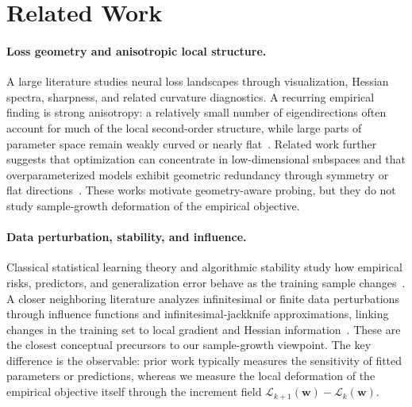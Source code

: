 \documentclass{article}
\begin{document}
\section{Related Work}\label{sec:related}

\paragraph{Loss geometry and anisotropic local structure.}
A large literature studies neural loss landscapes through visualization, Hessian spectra, sharpness, and related curvature diagnostics. A recurring empirical finding is strong anisotropy: a relatively small number of eigendirections often account for much of the local second-order structure, while large parts of parameter space remain weakly curved or nearly flat~\citep{li2018visualizing,sagun2017hessian,ghorbani2019investigation,papyan2019fullspectrum,xu2024mining}. Related work further suggests that optimization can concentrate in low-dimensional subspaces and that overparameterized models exhibit geometric redundancy through symmetry or flat directions~\citep{gurari2018tiny,li2018intrinsic,simsek2021geometry,draxler2018essentially,garipov2018mode}. These works motivate geometry-aware probing, but they do not study sample-growth deformation of the empirical objective.

\paragraph{Data perturbation, stability, and influence.}
Classical statistical learning theory and algorithmic stability study how empirical risks, predictors, and generalization error behave as the training sample changes~\citep{vapnik1998statistical,shalev2014understanding,bousquet2002stability,hardt2016train,feldman2019high,bousquet2020sharper}. A closer neighboring literature analyzes infinitesimal or finite data perturbations through influence functions and infinitesimal-jackknife approximations, linking changes in the training set to local gradient and Hessian information~\citep{koh2017influence,giordano2019swiss,koh2019group,basu2020secondorder}. These are the closest conceptual precursors to our sample-growth viewpoint. The key difference is the observable: prior work typically measures the sensitivity of fitted parameters or predictions, whereas we measure the local deformation of the empirical objective itself through the increment field $\mathcal L_{k+1}(\mathbf w)-\mathcal L_k(\mathbf w)$.
\end{document}
